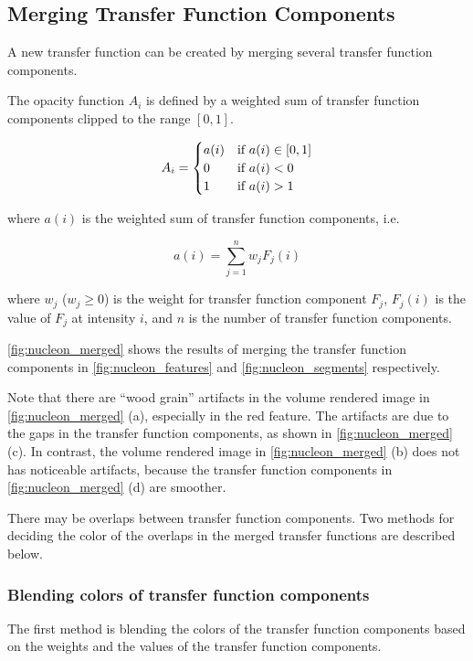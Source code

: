 \documentclass[twoside,twocolumn,10pt]{article}
\begin{document}
\subsection{Merging Transfer Function Components}
A new transfer function can be created by merging several transfer function components.

The opacity function $ A_{i} $ is defined by a weighted sum of transfer function components clipped to the range $ [0,1] $.

\[
A_{i} =
\begin{cases}
a(i) & \text{if $ a(i) \in [0,1] $} \\
0 & \text{if $ a(i)<0 $} \\
1 & \text{if $ a(i)>1 $}
\end{cases}
\]

where $ a(i) $ is the weighted sum of transfer function components, i.e.

\[ 
a(i)=\sum_{j=1}^{n} w_{j}F_{j}(i)
\]

where $ w_{j} $ ($ w_{j} \geq 0 $) is the weight for transfer function component $ F_{j} $, $ F_{j}(i) $ is the value of $ F_{j} $ at intensity $ i $, and $ n $ is the number of transfer function components.

\autoref{fig:nucleon_merged} shows the results of merging the transfer function components in \autoref{fig:nucleon_features} and \autoref{fig:nucleon_segments} respectively.

Note that there are ``wood grain'' artifacts in the volume rendered image in \autoref{fig:nucleon_merged} (a), especially in the red feature. The artifacts are due to the gaps in the transfer function components, as shown in \autoref{fig:nucleon_merged} (c).
In contrast, the volume rendered image in \autoref{fig:nucleon_merged} (b) does not has noticeable artifacts, because the transfer function components in \autoref{fig:nucleon_merged} (d) are smoother.

There may be overlaps between transfer function components. Two methods for deciding the color of the overlaps in the merged transfer functions are described below.

\subsubsection{Blending colors of transfer function components}
The first method is blending the colors of the transfer function components based on the weights and the values of the transfer function components.
\end{document}

